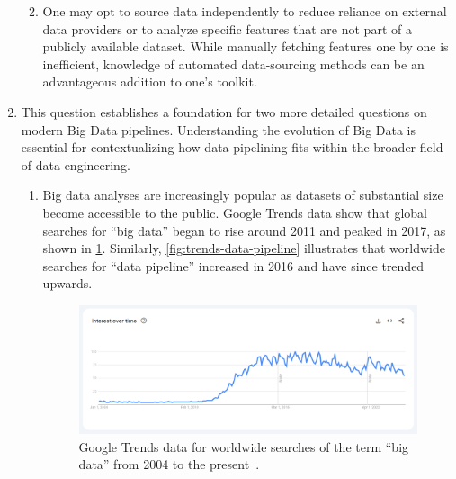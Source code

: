 \begin{enumerate}
\begin{enumerate}
        \medskip
        \item[] 

        One may opt to source data independently to reduce reliance on external data providers or to analyze specific features that are not part of a publicly available dataset.
        While manually fetching features one by one is inefficient, knowledge of automated data-sourcing methods can be an advantageous addition to one's toolkit.
    \end{enumerate}

    \item[] 

    This question establishes a foundation for two more detailed questions on modern Big Data pipelines.
    Understanding the evolution of Big Data is essential for contextualizing how data pipelining fits within the broader field of data engineering.

    \begin{enumerate}
        \item[] 

        Big data analyses are increasingly popular as datasets of substantial size become accessible to the public.
        Google Trends data show that global searches for ``big data'' began to rise around 2011 and peaked in 2017, as shown in \cref{fig:trends-big-data}.
        Similarly, \cref{fig:trends-data-pipeline} illustrates that worldwide searches for ``data pipeline'' increased in 2016 and have since trended upwards.

        \begin{figure}[H]
            \centering
            \includegraphics[width=\textwidth]{figures/trends-big-data.png}
            \caption{Google Trends data for worldwide searches of the term ``big data'' from 2004 to the present~\cite{Go2024}.}
            \label{fig:trends-big-data}
        \end{figure}


\end{enumerate}
\end{enumerate}
